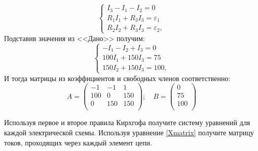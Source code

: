 \documentclass[14pt,a4paper]{article}
\begin{document}
\begin{equation}
    \begin{cases}
        I_3 -I_1 - I_2 = 0\\
        R_1I_1 + R_3I_3 = \varepsilon_1 \\
        R_2I_2 +R_3I_3 = \varepsilon_2,
    \end{cases}
\end{equation}
Подставив значения из <<Дано>> получим:
\begin{equation}
    \begin{cases}
        -I_1 -I_2 + I_3 = 0\\
        100I_1 + 150I_3 = 75 \\
        150I_2 + 150I_3 = 100,
    \end{cases}
\end{equation}
И тогда матрицы из коэффициентов и свободных членов соответственно:
\begin{equation}
    A = \begin{pmatrix}
        -1 & -1   & 1   \\
        100 & 0   & 150  \\
        0 & 150   & 150  \\
    \end{pmatrix}; \quad B =
    \begin{pmatrix}
        0  \\
        75  \\
        100 \\
    \end{pmatrix}
\end{equation}
\progress{}
\setcounter{NumVar}{1}
\newcommand\showNumTask{\stepcounter{NumTask}\theNumTask}
\newcommand{\variant}{
\begin{center}
    \Large{Вариант №\theNumVar}
    \setcounter{NumTask}{0}
    \addtocounter{NumVar}{1}
\end{center}    
}

Используя первое и второе правила Кирхгофа получите систему уравнений для каждой электрической схемы. Используя уравнение \ref{Xmatrix} получите матрицу токов, проходящих через каждый элемент цепи.
\end{document}
